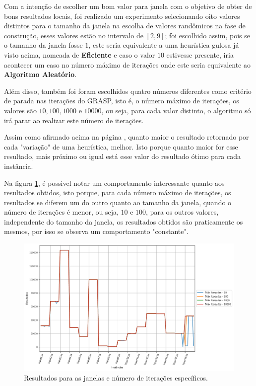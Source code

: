 \documentclass[a4paper, 12pt]{article}
\begin{document}
Com a intenção de escolher um bom valor para janela com o objetivo de obter de bons resultados locais,
foi realizado um experimento selecionando oito valores distintos para o tamanho da janela na escolha
de valores randômicos na fase de construção, esses valores estão no intervalo de $[2,9]$; foi escolhido assim,
pois se o tamanho da janela fosse $1$, este seria equivalente a uma heurística gulosa já visto acima, nomeada de 
\textbf{Eficiente} e caso o valor $10$ estivesse presente, iria acontecer um caso no número máximo de iterações
onde este seria equivalente ao \textbf{Algoritmo Aleatório}.

Além disso, também foi foram escolhidos quatro números diferentes
como critério de parada nas iterações do GRASP, isto é, o número máximo de iterações, os valores são
$10,100,1000$ e $10000$, ou seja, para cada valor distinto, o algoritmo só irá parar ao realizar este número de iterações.

Assim como afirmado acima na página \pageref{tab:gap_greedy}, quanto maior o resultado retornado por cada 
"variação" de uma heurística, melhor. Isto porque quanto maior for esse resultado, mais próximo ou igual 
está esse valor do resultado ótimo para cada instância.

Na figura \ref{all_grasp}, é possivel notar um comportamento interessante quanto aos resultados obtidos, isto porque,
para cada número máximo de iterações, os resultados se diferem um do outro quanto ao tamanho da janela, quando
o número de iterações é menor, ou seja, $10$ e $100$, para os outros valores, independente do tamanho da janela,
os resultados obtidos são praticamente os mesmos, por isso se observa um comportamento "constante".

\begin{figure}[h]
    \centering
    \includegraphics[width=0.7\linewidth]{../imgs/all_grasp.pdf}
    \caption{Resultados para as janelas e número de iterações específicos.}
    \label{all_grasp}
\end{figure}
\end{document}
